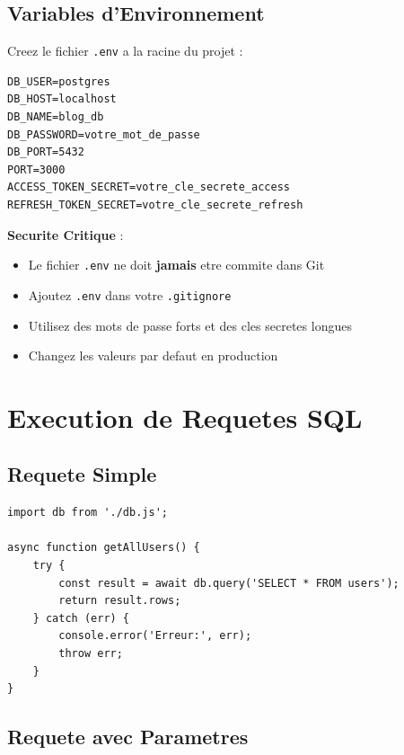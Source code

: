 \documentclass[a4paper,12pt]{book}
\begin{document}
\subsection{Variables d'Environnement}

Creez le fichier \texttt{.env} a la racine du projet :

\begin{lstlisting}[style=bash, caption=.env - Variables d'environnement]
DB_USER=postgres
DB_HOST=localhost
DB_NAME=blog_db
DB_PASSWORD=votre_mot_de_passe
DB_PORT=5432
PORT=3000
ACCESS_TOKEN_SECRET=votre_cle_secrete_access
REFRESH_TOKEN_SECRET=votre_cle_secrete_refresh
\end{lstlisting}

\begin{warningbox}
    \textbf{Securite Critique} :
    \begin{itemize}
        \item Le fichier \texttt{.env} ne doit \textbf{jamais} etre commite dans Git
        \item Ajoutez \texttt{.env} dans votre \texttt{.gitignore}
        \item Utilisez des mots de passe forts et des cles secretes longues
        \item Changez les valeurs par defaut en production
    \end{itemize}
\end{warningbox}

\section{Execution de Requetes SQL}

\subsection{Requete Simple}

\begin{lstlisting}[style=javascript, caption=Execution d'une requete simple]
import db from './db.js';

async function getAllUsers() {
    try {
        const result = await db.query('SELECT * FROM users');
        return result.rows;
    } catch (err) {
        console.error('Erreur:', err);
        throw err;
    }
}
\end{lstlisting}

\subsection{Requete avec Parametres}
\end{document}
